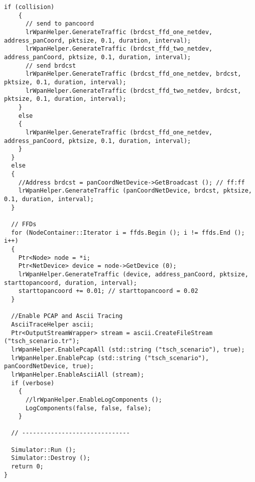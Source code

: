 \begin{lstlisting}[frame=single]
    if (collision)
    {
      // send to pancoord
      lrWpanHelper.GenerateTraffic (brdcst_ffd_one_netdev, address_panCoord, pktsize, 0.1, duration, interval);
      lrWpanHelper.GenerateTraffic (brdcst_ffd_two_netdev, address_panCoord, pktsize, 0.1, duration, interval);
      // send brdcst
      lrWpanHelper.GenerateTraffic (brdcst_ffd_one_netdev, brdcst, pktsize, 0.1, duration, interval);
      lrWpanHelper.GenerateTraffic (brdcst_ffd_two_netdev, brdcst, pktsize, 0.1, duration, interval);
    }
    else
    {
      lrWpanHelper.GenerateTraffic (brdcst_ffd_one_netdev, address_panCoord, pktsize, 0.1, duration, interval);
    }
  }
  else
  {
    //Address brdcst = panCoordNetDevice->GetBroadcast (); // ff:ff
    lrWpanHelper.GenerateTraffic (panCoordNetDevice, brdcst, pktsize, 0.1, duration, interval);
  }

  // FFDs
  for (NodeContainer::Iterator i = ffds.Begin (); i != ffds.End (); i++)
  {
    Ptr<Node> node = *i;
    Ptr<NetDevice> device = node->GetDevice (0);
    lrWpanHelper.GenerateTraffic (device, address_panCoord, pktsize, starttopancoord, duration, interval);
    starttopancoord += 0.01; // starttopancoord = 0.02
  }

  //Enable PCAP and Ascii Tracing
  AsciiTraceHelper ascii;
  Ptr<OutputStreamWrapper> stream = ascii.CreateFileStream ("tsch_scenario.tr");
  lrWpanHelper.EnablePcapAll (std::string ("tsch_scenario"), true);
  lrWpanHelper.EnablePcap (std::string ("tsch_scenario"), panCoordNetDevice, true);
  lrWpanHelper.EnableAsciiAll (stream);
  if (verbose)
    {
      //lrWpanHelper.EnableLogComponents ();
      LogComponents(false, false, false);
    }

  // ------------------------------

  Simulator::Run ();
  Simulator::Destroy ();
  return 0;
}

\end{lstlisting}

